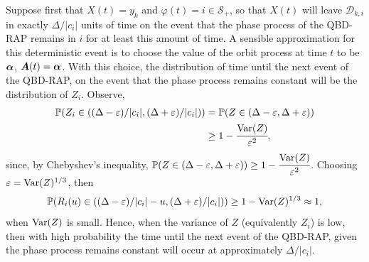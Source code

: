 Suppose first that \(X(t)=y_k\) and \(\varphi(t)=i\in\mathcal S_+\), so that \(X(t)\) will leave \(\mathcal D_{k,i}\) in exactly \(\Delta/|c_i|\) units of time on the event that the phase process of the QBD-RAP remains in \(i\) for at least this amount of time. A sensible approximation for this deterministic event is to choose the value of the orbit process at time \(t\) to be \(\boldsymbol \alpha\), \(\boldsymbol A(t)=\boldsymbol\alpha\). With this choice, the distribution of time until the next event of the QBD-RAP, on the event that the phase process remains constant will be the distribution of \(Z_i\). Observe, 
\begin{align*}
	\mathbb P(Z_i \in ((\Delta-\varepsilon)/|c_i|, (\Delta+\varepsilon)/|c_i|) ) 
	&= \mathbb P(Z\in (\Delta-\varepsilon, \Delta + \varepsilon))
	\\&\geq 1-\cfrac{\mathrm{Var}(Z)}{\varepsilon^2},
\end{align*}
since, by Chebyshev's inequality, \(\mathbb P(Z\in (\Delta-\varepsilon, \Delta + \varepsilon)) \geq 1- \cfrac{\mathrm{Var}(Z)}{\varepsilon^2}\). Choosing \(\varepsilon = \mathrm{Var}(Z)^{1/3}\), then 
\[\mathbb P(R_i(u) \in ((\Delta-\varepsilon)/|c_i|-u, (\Delta+\varepsilon)/|c_i|) )\geq 1-\mathrm{Var}(Z)^{1/3} \approx 1, \]
when \(\mathrm{Var}(Z)\) is small. Hence, when the variance of \(Z\) (equivalently \(Z_i\)) is low, then with high probability the time until the next event of the QBD-RAP, given the phase process remains constant will occur at approximately \(\Delta/|c_i|\). 

